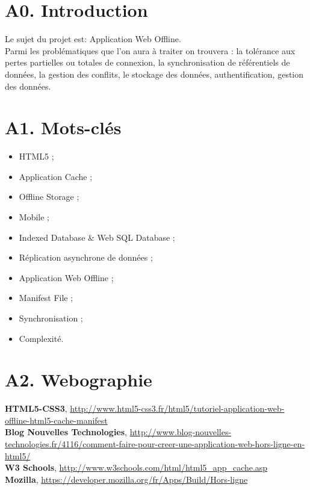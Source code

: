 \section{A0. Introduction}
	Le sujet du projet est: Application Web Offline.\\
	Parmi les problématiques que l'on aura à traiter on trouvera : la tolérance aux pertes partielles ou totales de connexion, la synchronisation de référentiels de données, la gestion des conflits, le stockage des données, authentification, gestion des données.

\section{A1. Mots-clés}

	\begin{itemize}
		\item HTML5 ; 
		\item Application Cache ; 
		\item Offline Storage ;
		\item Mobile ;
		\item Indexed Database \& Web SQL Database ;
		\item Réplication asynchrone de données ; 
		\item Application Web Offline ;
		\item Manifest File ;
		\item Synchronisation ;
		\item Complexité.
	\end{itemize}

\section{A2. Webographie}

	\textbf{HTML5-CSS3}, \url{http://www.html5-css3.fr/html5/tutoriel-application-web-offline-html5-cache-manifest}\\

	\textbf{Blog Nouvelles Technologies}, \url{http://www.blog-nouvelles-technologies.fr/4116/comment-faire-pour-creer-une-application-web-hors-ligne-en-html5/}\\

	\textbf{W3 Schools}, \url{http://www.w3schools.com/html/html5_app_cache.asp}\\

	\textbf{Mozilla}, \url{https://developer.mozilla.org/fr/Apps/Build/Hors-ligne}\\

